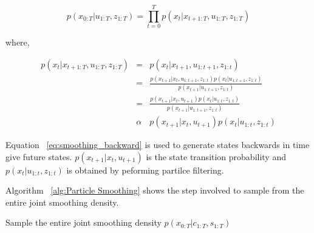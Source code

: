 \documentclass[12pt,draft]{dalcsthesis}
\begin{document}
\begin{equation}
p(x_{0:T}|u_{1:T},z_{1:T})=\prod_{t=0}^{T}p(x_{t}|x_{t+1:T},u_{1:T},z_{1:T})
\end{equation}

where,

\begin{eqnarray}
p(x_{t}|x_{t+1:T},u_{1:T},z_{1:T}) & = & p(x_{t}|x_{t+1},u_{1:t+1},z_{1:t})\\
 & = & \frac{p(x_{t+1}|x_{t},u_{1:t+1},z_{1:t})p(x_{t}|u_{1:t+1},z_{1:t})}{p(x_{t+1}|u_{1:t+1},z_{1:t})}\\
 & = & \frac{p(x_{t+1}|x_{t},u_{t+1})p(x_{t}|u_{1:t},z_{1:t})}{p(x_{t+1}|u_{1:t+1},z_{1:t})}\\
\label{eq:smoothing_backward} & \alpha & p(x_{t+1}|x_{t},u_{t+1})p(x_{t}|u_{1:t},z_{1:t})
\end{eqnarray}

Equation ~\ref{eq:smoothing_backward} is used to generate states backwards in time give future states. $p(x_{t+1}|x_{t},u_{t+1})$ is the state transition probability and $p(x_{t}|u_{1:t},z_{1:t})$ is obtained by peforming partilce filtering. 

Algorithm ~\ref{alg:Particle Smoothing} shows the step involved to sample from the entire joint smoothing density.

\begin{algorithm}[H]
 \SetAlgoLined
  	\label{alg:Particle Smoothing}
	\caption{Sample the entire joint smoothing density $p(x_{0:T}|c_{1:T},s_{1:T})$}
	
\end{algorithm}
\end{document}
